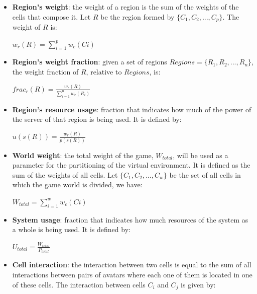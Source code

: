 \begin{itemize}
	\item \textbf{Region's weight}: the weight of a region is the sum of the weights of the cells that compose it. Let $R$ be the region formed by $\{C_1, C_2, ..., C_p\}$. The weight of $R$ is:
	
		\begin{center}
			$\displaystyle w_r(R) = \sum_{i=1}^{p} w_c(Ci)$
		\end{center}
		
		\item \textbf{Region's weight fraction}: given a set of regions $Regions  = \{R_1, R_2, ..., R_n\}$, the weight fraction of $R$, relative to $Regions$, is:
	
		\begin{center}
			$frac_r(R) = \frac{\displaystyle w_r(R)}{\displaystyle\sum_{i=1}^{n} w_r(R_i)}$
		\end{center}
		
	\item \textbf{Region's resource usage}: fraction that indicates how much of the power of the server of that region is being used. It is defined by:
	
		\begin{center}
			$u(s(R)) = \frac{\displaystyle w_r(R)}{\displaystyle p(s(R))}$	
		\end{center}
		
	\item \textbf{World weight}: the total weight of the game, $W_{total}$, will be used as a parameter for the partitioning of the virtual environment. It is defined as the sum of the weights of all cells. Let $\{C_1, C_2, ..., C_w\}$ be the set of all cells in which the game world is divided, we have:
	
		\begin{center}
			$\displaystyle W_{total} = \sum_{i=1}^{w} w_c(Ci)$
		\end{center}
	
	
	\item \textbf{System usage}: fraction that indicates how much resources of the system as a whole is being used. It is defined by:

		\begin{center}
			$\displaystyle U_{total} = \frac{W_{total}}{P_{total}}$
		\end{center}
	
	\item \textbf{Cell interaction}: the interaction between two cells is equal to the sum of all interactions between pairs of avatars where each one of them is located in one of these cells. The interaction between cells $C_i$ and $C_j$ is given by:
	

\end{itemize}
